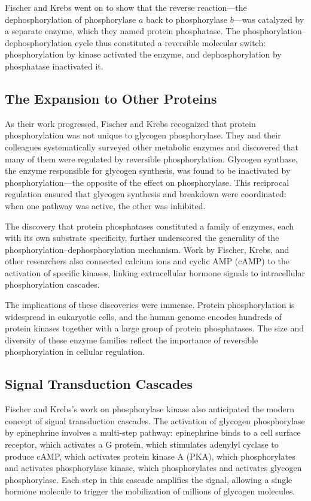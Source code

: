 Fischer and Krebs went on to show that the reverse reaction---the dephosphorylation of phosphorylase $a$ back to phosphorylase $b$---was catalyzed by a separate enzyme, which they named protein phosphatase. The phosphorylation--dephosphorylation cycle thus constituted a reversible molecular switch: phosphorylation by kinase activated the enzyme, and dephosphorylation by phosphatase inactivated it.

\subsection{The Expansion to Other Proteins}

As their work progressed, Fischer and Krebs recognized that protein phosphorylation was not unique to glycogen phosphorylase. They and their colleagues systematically surveyed other metabolic enzymes and discovered that many of them were regulated by reversible phosphorylation. Glycogen synthase, the enzyme responsible for glycogen synthesis, was found to be inactivated by phosphorylation---the opposite of the effect on phosphorylase. This reciprocal regulation ensured that glycogen synthesis and breakdown were coordinated: when one pathway was active, the other was inhibited.

The discovery that protein phosphatases constituted a family of enzymes, each with its own substrate specificity, further underscored the generality of the phosphorylation--dephosphorylation mechanism. Work by Fischer, Krebs, and other researchers also connected calcium ions and cyclic AMP (cAMP) to the activation of specific kinases, linking extracellular hormone signals to intracellular phosphorylation cascades.

The implications of these discoveries were immense. Protein phosphorylation is widespread in eukaryotic cells, and the human genome encodes hundreds of protein kinases together with a large group of protein phosphatases. The size and diversity of these enzyme families reflect the importance of reversible phosphorylation in cellular regulation.

\subsection{Signal Transduction Cascades}

Fischer and Krebs's work on phosphorylase kinase also anticipated the modern concept of signal transduction cascades. The activation of glycogen phosphorylase by epinephrine involves a multi-step pathway: epinephrine binds to a cell surface receptor, which activates a G protein, which stimulates adenylyl cyclase to produce cAMP, which activates protein kinase A (PKA), which phosphorylates and activates phosphorylase kinase, which phosphorylates and activates glycogen phosphorylase. Each step in this cascade amplifies the signal, allowing a single hormone molecule to trigger the mobilization of millions of glycogen molecules.

